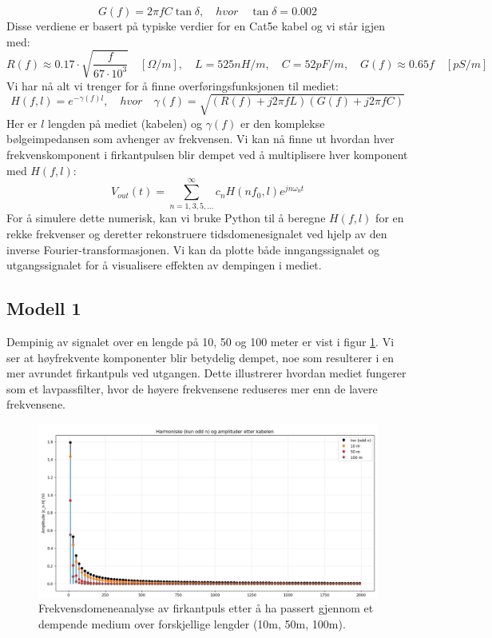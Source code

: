 \[
    G(f) = 2\pi f C \tan \delta, \quad hvor \quad \tan \delta = 0.002
\]
Disse verdiene er basert på typiske verdier for en Cat5e kabel og vi står igjen med:
\[
    R(f) \approx 0.17 \cdot \sqrt{\frac{f}{67 \cdot 10^3}} \quad [\Omega/m], \quad L = 525 nH/m, \quad C = 52 pF/m, \quad G(f) \approx 0.65f \quad [pS/m]
\]
\clearpage
\noindent Vi har nå alt vi trenger for å finne overføringsfunksjonen til mediet:
\[
    H(f, l) = e^{-\gamma(f) l}, \quad hvor \quad \gamma(f) = \sqrt{(R(f) + j 2\pi f L)(G(f) + j 2\pi f C)}
\]
Her er $l$ lengden på mediet (kabelen) og $\gamma(f)$ er den komplekse bølgeimpedansen som avhenger av frekvensen.
Vi kan nå finne ut hvordan hver frekvenskomponent i firkantpulsen blir dempet ved å multiplisere hver komponent med $H(f, l)$:
\[
    V_{out}(t) = \sum_{n=1,3,5,...}^{\infty} c_n H(n f_0, l) e^{j n \omega_0 t}
\]
For å simulere dette numerisk, kan vi bruke Python til å beregne $H(f, l)$ for en rekke frekvenser og deretter rekonstruere tidsdomenesignalet ved hjelp av den inverse Fourier-transformasjonen.
Vi kan da plotte både inngangssignalet og utgangssignalet for å visualisere effekten av dempingen i mediet.
\subsection{Modell 1}
Dempinig av signalet over en lengde på 10, 50 og 100 meter er vist i figur \ref{fig:modell1}. Vi ser at høyfrekvente komponenter blir betydelig dempet, noe som resulterer i en mer avrundet firkantpuls ved utgangen. Dette illustrerer hvordan mediet fungerer som et lavpassfilter, hvor de høyere frekvensene reduseres mer enn de lavere frekvensene.
\begin{figure}[h]
    \centering
    \includegraphics[width=1\textwidth]{Media/modellering1.png}
    \caption{Frekvensdomeneanalyse av firkantpuls etter å ha passert gjennom et dempende medium over forskjellige lengder (10m, 50m, 100m).}
    \label{fig:modell1}
\end{figure}
